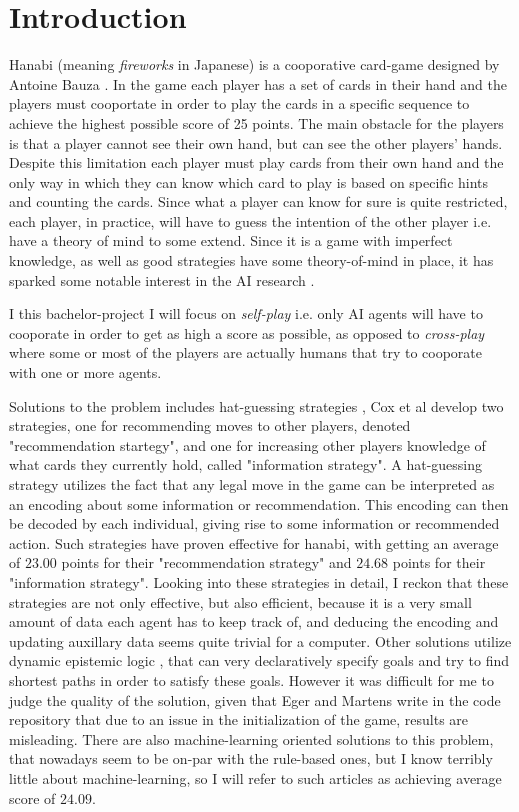 \section{Introduction}

Hanabi (meaning \emph{fireworks} in Japanese) is a cooporative card-game designed by Antoine Bauza \cite{BGGHanabi}. 
In the game each player has a set of cards in their hand and the players must cooportate in order to play the cards in a specific sequence to achieve the highest possible score of 25 points.
The main obstacle for the players is that a player cannot see their own hand, but can see the other players' hands. 
Despite this limitation each player must play cards from their own hand and the only way in which they can know which card to play is based on specific hints and counting the cards. 
Since what a player can know for sure is quite restricted, each player, in practice, will have to guess the intention of the other player i.e. have a theory of mind to some extend. 
Since it is a game with imperfect knowledge, as well as good strategies have some theory-of-mind in place, it has sparked some notable interest in the AI research \cite{DeepmindAndOthers}. 

I this bachelor-project I will focus on \emph{self-play} i.e. only AI agents will have to cooporate in order to get as high a score as possible, as opposed to \emph{cross-play} where some or most of the players are actually humans that try to cooporate with one or more agents.  

Solutions to the problem includes hat-guessing strategies \cite{CoxEtAl2015}, Cox et al develop two strategies, one for recommending moves to other players, denoted "recommendation startegy", and one for increasing other players knowledge of what cards they currently hold, called "information strategy". 
A hat-guessing strategy utilizes the fact that any legal move in the game can be interpreted as an encoding about some information or recommendation.
This encoding can then be decoded by each individual, giving rise to some information or recommended action. 
Such strategies have proven effective for hanabi, with \cite{CoxEtAl2015} getting an average of $23.00$ points for their "recommendation strategy" and $24.68$ points for their "information strategy". 
Looking into these strategies in detail, I reckon that these strategies are not only effective, but also efficient, because it is a very small amount of data each agent has to keep track of, and deducing the encoding and updating auxillary data seems quite trivial for a computer.
Other solutions utilize dynamic epistemic logic \cite{EgerAndMartens17}, that can very declaratively specify goals and try to find shortest paths in order to satisfy these goals. However it was difficult for me to judge the quality of the solution, given that Eger and Martens write in the code repository \cite{Ostari} that due to an issue in the initialization of the game, results are misleading. 
There are also machine-learning oriented solutions to this problem, that nowadays seem to be on-par with the rule-based ones, but I know terribly little about machine-learning, so I will refer to such articles as \cite{hu2021otherplay} achieving average score of $24.09$.

